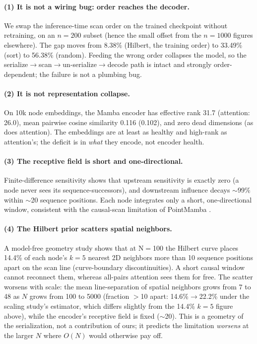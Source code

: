 \documentclass[11pt]{article}
\newcommand{\pct}{\%}
\begin{document}
\paragraph{(1) It is not a wiring bug: order reaches the decoder.}
We swap the inference-time scan order on the trained checkpoint without
retraining, on an $n=200$ subset (hence the small offset from the $n=1000$
figures elsewhere). The gap moves from 8.38\pct{} (Hilbert, the training order)
to 33.49\pct{} (sort) to 56.38\pct{} (random). Feeding the wrong order collapses
the model, so the serialize$\rightarrow$scan$\rightarrow$un-serialize$\rightarrow$decode
path is intact and strongly order-dependent; the failure is not a plumbing bug.

\paragraph{(2) It is not representation collapse.}
On 10k node embeddings, the Mamba encoder has effective rank 31.7 (attention:
26.0), mean pairwise cosine similarity 0.116 (0.102), and zero dead dimensions
(as does attention). The embeddings are at least as healthy and high-rank as
attention's; the deficit is in \emph{what} they encode, not encoder health.

\paragraph{(3) The receptive field is short and one-directional.}
Finite-difference sensitivity shows that upstream sensitivity is exactly zero (a
node never sees its sequence-successors), and downstream influence decays
$\sim$99\pct{} within $\sim$20 sequence positions. Each node integrates only a
short, one-directional window, consistent with the causal-scan limitation of
PointMamba \citep{pointmamba2024}.

\paragraph{(4) The Hilbert prior scatters spatial neighbors.}
A model-free geometry study shows that at N$=$100 the Hilbert curve places
14.4\pct{} of each node's $k=5$ nearest 2D neighbors more than 10 sequence
positions apart on the scan line (curve-boundary discontinuities). A short causal
window cannot reconnect them, whereas all-pairs attention sees them for free. The
scatter worsens with scale: the mean line-separation of spatial neighbors grows
from 7 to 48 as $N$ grows from 100 to 5000 (fraction $>$10 apart:
14.6\pct{}$\rightarrow$22.2\pct{} under the scaling study's estimator, which
differs slightly from the 14.4\pct{} $k{=}5$ figure above), while the encoder's
receptive field is fixed ($\sim$20). This is a geometry of the serialization, not a contribution of ours;
it predicts the limitation \emph{worsens} at the larger $N$ where $O(N)$ would
otherwise pay off.
\end{document}
